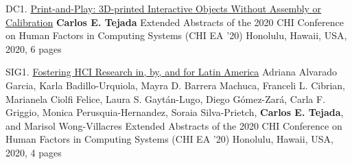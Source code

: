     \begin{cvpublications}
      \cvpublication%
        {DC1.}%
        {\href{https://doi.org/10.1145/3334480.3375025}{Print-and-Play: 3D-printed Interactive Objects Without Assembly or Calibration}}%
        {\textbf{Carlos E. Tejada}}%
        {Extended Abstracts of the 2020 CHI Conference on Human Factors in Computing Systems (CHI EA ’20)}%
        {Honolulu, Hawaii, USA, 2020, 6 pages}
    \end{cvpublications}

    \begin{cvpublications}
      \cvpublication%
        {SIG1.}%
        {\href{https://doi.org/10.1145/3334480.3381055}{Fostering HCI Research in, by, and for Latin America}}%
        {Adriana Alvarado Garcia, Karla Badillo-Urquiola, Mayra D. Barrera Machuca, Franceli L. Cibrian, Marianela Ciolfi Felice, Laura S. Gaytán-Lugo, Diego Gómez-Zará, Carla F. Griggio, Monica Perusquia-Hernandez, Soraia Silva-Prietch, \textbf{Carlos E. Tejada}, and Marisol Wong-Villacres}%
        {Extended Abstracts of the 2020 CHI Conference on Human Factors in Computing Systems (CHI EA ’20)}%
        {Honolulu, Hawaii, USA, 2020, 4 pages}
    \end{cvpublications}
